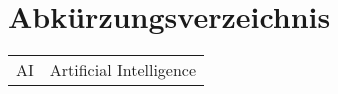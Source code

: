 
\chapter*{Abkürzungsverzeichnis}

\manualmark           %


\begin{tabularx}{\linewidth}{p{3cm}X}
	AI				& Artificial Intelligence\\
\end{tabularx}

\pagestyle{plain}